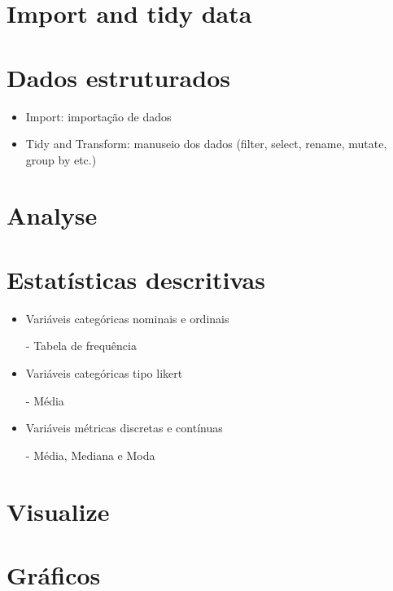 \documentclass[a4paper,12pt]{article}
\begin{document}
\section{Import and tidy data}
\section*{Dados estruturados}

\begin{itemize}
    \item Import: importação de dados

    \item Tidy and Transform: manuseio dos dados (filter, select, rename, mutate, group by etc.)

\end{itemize}

\pagebreak

\section{Analyse}
\section*{Estatísticas descritivas}

\begin{itemize}
    \item Variáveis categóricas nominais e ordinais

    \item[-] Tabela de frequência

    \item Variáveis categóricas tipo likert

    \item[-] Média

     \item Variáveis métricas discretas e contínuas

     \item[-] Média, Mediana e Moda

\end{itemize}

\section{Visualize}
\section*{Gráficos}
\end{document}
